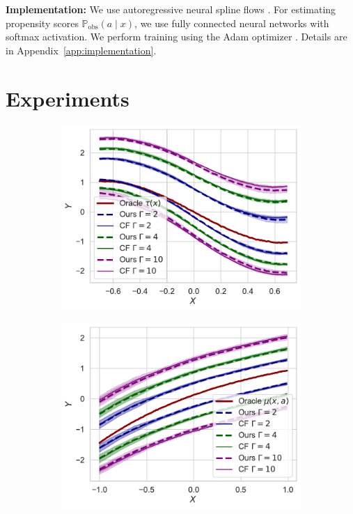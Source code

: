 \documentclass{article} %
\theoremstyle{definition}
\theoremstyle{plain}
\begin{document}
\textbf{Implementation:} We use autoregressive neural spline flows \citep{Durkan.2019, Dolatabadi.2020}. For estimating propensity scores $\mathbb{P}_\mathrm{obs}(a \mid x)$, we use fully connected neural networks with softmax activation. We perform training using the Adam optimizer \citep{Kingma.2015}. Details are in Appendix~\ref{app:implementation}.

\section{Experiments}\label{sec:experiments}
 
\begin{figure}
\vspace{-0.4cm}
 \centering
\begin{subfigure}{0.30\textwidth}
  \centering
  \includegraphics[width=1\linewidth]{figures/plot_binary_1D.pdf}
\end{subfigure}%
\begin{subfigure}{0.30\textwidth}
  \centering
  \includegraphics[width=1\linewidth]{figures/plot_continuous_1D_a05.pdf}

\end{subfigure}
\end{figure}
\end{document}
